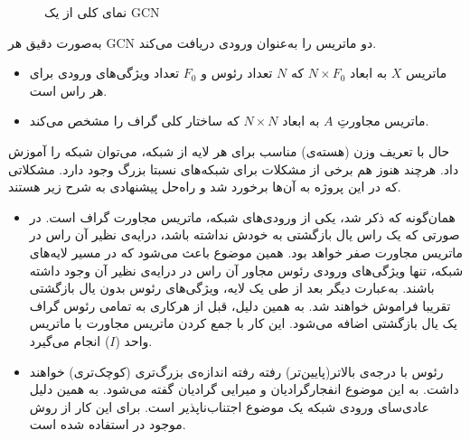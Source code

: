 \begin{figure}[ht]
\caption[نمای کلی از یک GCN]{{\footnotesize نمای کلی از یک GCN} \cite{GNN_structure}}
\label{شکل:گراف}
\end{figure}


به‌صورت دقیق هر GCN دو ماتریس را به‌عنوان ورودی دریافت می‌کند. 
\begin{itemize}

\item  ماتریس $X$ به ابعاد $N\times F_0$ که $N$ تعداد رئوس و $F_0$ تعداد ویژگی‌های ورودی برای هر راس است. 
\item  ماتریس مجاورتِ $A$ به ابعاد $N\times N$ که ساختار کلی گراف را مشخص می‌کند.
\end{itemize}

حال با تعریف وزن (هسته‌ی) مناسب برای هر لایه از شبکه، می‌توان شبکه را آموزش داد. هرچند هنوز هم برخی از مشکلات برای شبکه‌های نسبتا بزرگ وجود دارد. مشکلاتی که در این پروژه به آن‌ها برخورد شد و راه‌حل پیشنهادی به شرح زیر هستند.

\begin{itemize}
\item همان‌گونه که ذکر شد، یکی از ورودی‌های شبکه، ماتریس مجاورت گراف است. در صورتی که یک راس یال بازگشتی به خودش نداشته باشد، درایه‌ی نظیر آن راس در ماتریس مجاورت صفر خواهد بود. همین موضوع باعث می‌شود که در مسیر لایه‌های شبکه، تنها ویژگی‌های ورودی رئوس مجاور آن راس در درایه‌ی نظیر آن وجود داشته باشند. به‌عبارت دیگر بعد از طی یک لایه، ویژگی‌های رئوس بدون یال بازگشتی تقریبا فراموش خواهند شد. به همین دلیل، قبل از هرکاری به تمامی رئوس گراف یک یال بازگشتی اضافه می‌شود. این کار با جمع کردن ماتریس مجاورت با ماتریس واحد ($I$) انجام می‌گیرد.
\item رئوس با درجه‌ی بالاتر(پایین‌تر) رفته رفته اندازه‌ی بزرگ‌تری (کوچک‌تری) خواهند داشت. به این موضوع انفجارگرادیان و میرایی گرادیان  گفته می‌شود. به همین دلیل عادی‌سای ورودی شبکه یک موضوع اجتناب‌ناپذیر است. برای این کار از روش موجود در \cite{gcn_paper} استفاده شده است.
\end{itemize}



